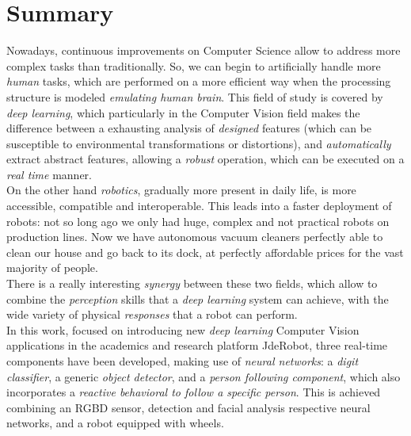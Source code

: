 \chapter*{Summary}
	Nowadays, continuous improvements on Computer Science allow to address more complex tasks than traditionally. So, we can begin to artificially handle more \emph{human} tasks, which are performed on a more efficient way when the processing structure is modeled \emph{emulating human brain}. This field of study is covered by \emph{deep learning}, which particularly in the Computer Vision field makes the difference between a exhausting analysis of \emph{designed} features (which can be susceptible to environmental transformations or distortions), and \emph{automatically} extract abstract features, allowing a \emph{robust} operation, which can be executed on a  \emph{real time} manner.\\
	
	
	On the other hand \emph{robotics}, gradually more present in daily life, is more accessible, compatible and interoperable. This leads into a faster deployment of robots: not so long ago we only had huge, complex and not practical robots on production lines. Now we have autonomous vacuum cleaners perfectly able to clean our house and go back to its dock, at perfectly affordable prices for the vast majority of people.\\
	
	
	There is a really interesting \emph{synergy} between these two fields, which allow to combine the \emph{perception} skills that a \emph{deep learning} system can achieve, with the wide variety of physical \emph{responses} that a robot can perform.\\
	
	
	In this work, focused on introducing new \emph{deep learning} Computer Vision applications in the academics and research platform JdeRobot, three real-time components have been developed, making use of \emph{neural networks}: a \emph{digit classifier}, a generic \emph{object detector}, and a \emph{person following component}, which also incorporates a \emph{reactive behavioral to follow a specific person}. This is achieved combining an RGBD sensor, detection and facial analysis respective neural networks, and a robot equipped with wheels.